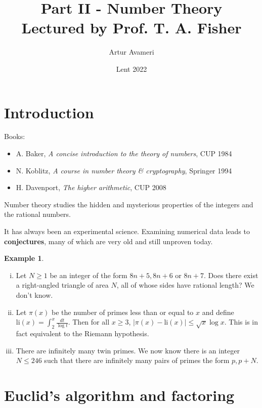 \documentclass{article}
\title{Part II - Number Theory
    \\ \large
    Lectured by Prof. T. A. Fisher
}
\author{Artur Avameri}
\date{Lent 2022}
\theoremstyle{definition}
\newtheorem{example}[theorem]{Example}
\theoremstyle{remark}
\begin{document}
\maketitle
\tableofcontents
\newpage

\section{Introduction}


Books: 
\begin{itemize}
    \item A. Baker, \textit{A concise introduction to the theory of numbers}, CUP 1984
    \item N. Koblitz, \textit{A course in number theory \& cryptography}, Springer 1994
    \item H. Davenport, \textit{The higher arithmetic}, CUP 2008
\end{itemize}

Number theory studies the hidden and mysterious properties of the integers and the rational numbers.

It has always been an experimental science. Examining numerical data leads to \textbf{conjectures}, many of which are very old and still unproven today.

\begin{example}
    \begin{enumerate}[(i)]
        \item Let $N\ge 1$ be an integer of the form $8n+5, 8n+6$ or $8n+7$. Does there exist a right-angled triangle of area $N$, all of whose sides have rational length? We don't know.
        \item Let $\pi(x)$ be the number of primes less than or equal to $x$ and define $\text{li}(x) = \int_{2}^{x} \frac{dt}{\log t}$. Then for all $x \ge 3$, $|\pi(x) - \text{li}(x)| \le \sqrt{x}\log x$. This is in fact equivalent to the Riemann hypothesis.
        \item There are infinitely many twin primes. We now know there is an integer $N\le 246$ such that there are infinitely many pairs of primes the form $p, p+N$.
    \end{enumerate}
\end{example}

\newpage

\section{Euclid's algorithm and factoring}
\end{document}
